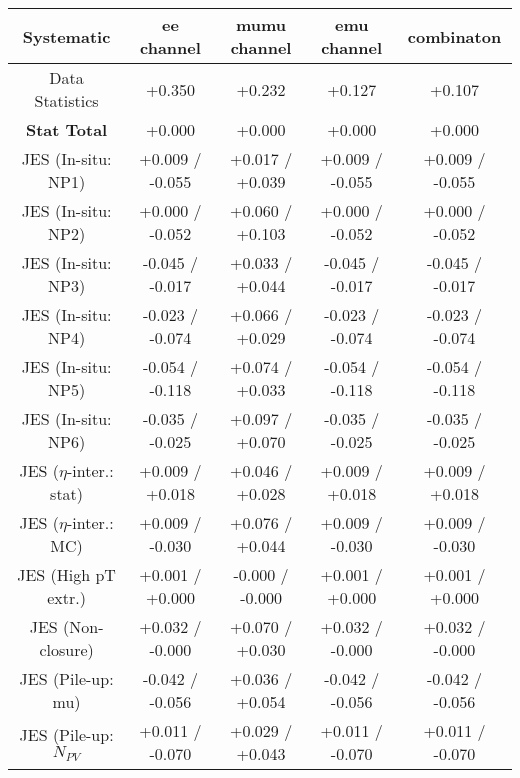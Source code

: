 \begin{table}[htbp]
\scriptsize
  \begin{center} 
  \begin{tabular}{|c|c|c|c|c|}
  \hline
Systematic                            &  ee channel&  mumu channel&  emu channel&  combinaton\\
  \hline
Data Statistics                       &+0.350              & +0.232              & +0.127              & +0.107             \\
\hline
\textbf{Stat Total}                   &+0.000              & +0.000              & +0.000              & +0.000             \\
\hline
JES (In-situ: NP1)                    &+0.009   / -0.055   & +0.017   / +0.039   & +0.009   / -0.055   & +0.009   / -0.055  \\
JES (In-situ: NP2)                    &+0.000   / -0.052   & +0.060   / +0.103   & +0.000   / -0.052   & +0.000   / -0.052  \\
JES (In-situ: NP3)                    &-0.045   / -0.017   & +0.033   / +0.044   & -0.045   / -0.017   & -0.045   / -0.017  \\
JES (In-situ: NP4)                    &-0.023   / -0.074   & +0.066   / +0.029   & -0.023   / -0.074   & -0.023   / -0.074  \\
JES (In-situ: NP5)                    &-0.054   / -0.118   & +0.074   / +0.033   & -0.054   / -0.118   & -0.054   / -0.118  \\
JES (In-situ: NP6)                    &-0.035   / -0.025   & +0.097   / +0.070   & -0.035   / -0.025   & -0.035   / -0.025  \\
JES ($\eta$-inter.: stat)               &+0.009   / +0.018   & +0.046   / +0.028   & +0.009   / +0.018   & +0.009   / +0.018  \\
JES ($\eta$-inter.: MC)                 &+0.009   / -0.030   & +0.076   / +0.044   & +0.009   / -0.030   & +0.009   / -0.030  \\
JES (High pT extr.)                  &+0.001   / +0.000   & -0.000   / -0.000   & +0.001   / +0.000   & +0.001   / +0.000  \\
JES (Non-closure)                     &+0.032   / -0.000   & +0.070   / +0.030   & +0.032   / -0.000   & +0.032   / -0.000  \\
JES (Pile-up: mu)                     &-0.042   / -0.056   & +0.036   / +0.054   & -0.042   / -0.056   & -0.042   / -0.056  \\
JES (Pile-up: $N_{PV}$                  &+0.011   / -0.070   & +0.029   / +0.043   & +0.011   / -0.070   & +0.011   / -0.070  \\

\end{tabular}
\end{center}
\end{table}
